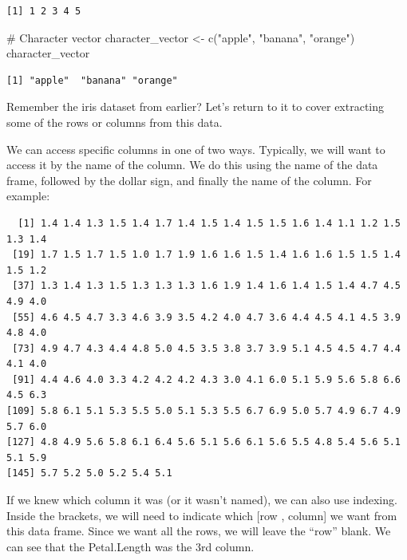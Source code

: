 \documentclass[
  letterpaper,
  DIV=11,
  numbers=noendperiod]{scrreprt}
\newenvironment{Shaded}{\begin{snugshade}}{\end{snugshade}}
\newcommand{\CommentTok}[1]{\textcolor[rgb]{0.37,0.37,0.37}{#1}}
\newcommand{\FunctionTok}[1]{\textcolor[rgb]{0.28,0.35,0.67}{#1}}
\newcommand{\NormalTok}[1]{\textcolor[rgb]{0.00,0.23,0.31}{#1}}
\newcommand{\OtherTok}[1]{\textcolor[rgb]{0.00,0.23,0.31}{#1}}
\newcommand{\SpecialCharTok}[1]{\textcolor[rgb]{0.37,0.37,0.37}{#1}}
\newcommand{\StringTok}[1]{\textcolor[rgb]{0.13,0.47,0.30}{#1}}
\begin{document}
\begin{verbatim}
[1] 1 2 3 4 5
\end{verbatim}

\begin{Shaded}
\begin{Highlighting}[]
\CommentTok{\# Character vector}
\NormalTok{character\_vector }\OtherTok{\textless{}{-}} \FunctionTok{c}\NormalTok{(}\StringTok{"apple"}\NormalTok{, }\StringTok{"banana"}\NormalTok{, }\StringTok{"orange"}\NormalTok{)}
\NormalTok{character\_vector}
\end{Highlighting}
\end{Shaded}

\begin{verbatim}
[1] "apple"  "banana" "orange"
\end{verbatim}

Remember the iris dataset from earlier? Let's return to it to cover
extracting some of the rows or columns from this data.

We can access specific columns in one of two ways. Typically, we will
want to access it by the name of the column. We do this using the name
of the data frame, followed by the dollar sign, and finally the name of
the column. For example:

\begin{Shaded}
\end{Shaded}

\begin{verbatim}
  [1] 1.4 1.4 1.3 1.5 1.4 1.7 1.4 1.5 1.4 1.5 1.5 1.6 1.4 1.1 1.2 1.5 1.3 1.4
 [19] 1.7 1.5 1.7 1.5 1.0 1.7 1.9 1.6 1.6 1.5 1.4 1.6 1.6 1.5 1.5 1.4 1.5 1.2
 [37] 1.3 1.4 1.3 1.5 1.3 1.3 1.3 1.6 1.9 1.4 1.6 1.4 1.5 1.4 4.7 4.5 4.9 4.0
 [55] 4.6 4.5 4.7 3.3 4.6 3.9 3.5 4.2 4.0 4.7 3.6 4.4 4.5 4.1 4.5 3.9 4.8 4.0
 [73] 4.9 4.7 4.3 4.4 4.8 5.0 4.5 3.5 3.8 3.7 3.9 5.1 4.5 4.5 4.7 4.4 4.1 4.0
 [91] 4.4 4.6 4.0 3.3 4.2 4.2 4.2 4.3 3.0 4.1 6.0 5.1 5.9 5.6 5.8 6.6 4.5 6.3
[109] 5.8 6.1 5.1 5.3 5.5 5.0 5.1 5.3 5.5 6.7 6.9 5.0 5.7 4.9 6.7 4.9 5.7 6.0
[127] 4.8 4.9 5.6 5.8 6.1 6.4 5.6 5.1 5.6 6.1 5.6 5.5 4.8 5.4 5.6 5.1 5.1 5.9
[145] 5.7 5.2 5.0 5.2 5.4 5.1
\end{verbatim}

If we knew which column it was (or it wasn't named), we can also use
indexing. Inside the brackets, we will need to indicate which {[}row ,
column{]} we want from this data frame. Since we want all the rows, we
will leave the ``row'' blank. We can see that the Petal.Length was the
3rd column.
\end{document}
